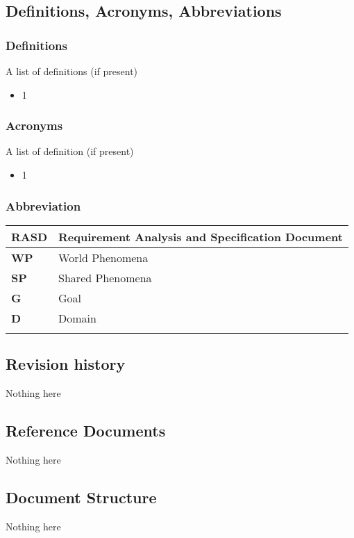 \subsection{Definitions, Acronyms, Abbreviations}
\subsubsection*{Definitions}
A list of definitions (if present)
\begin{itemize}
    \item 1
\end{itemize}
\subsubsection*{Acronyms}
A list of definition (if present)
\begin{itemize}
    \item 1
\end{itemize}
\subsubsection*{Abbreviation}
\begin{table}[h]
    \begin{tabular}{|l|l|}
        \toprule
        \textbf{RASD} & Requirement Analysis and Specification Document \\ \midrule
        \textbf{WP}   & World Phenomena                                 \\ \midrule
        \textbf{SP}   & Shared Phenomena                                \\ \midrule
        \textbf{G}    & Goal                                            \\ \midrule
        \textbf{D}    & Domain                                          \\ \midrule
                      &                                                 \\ \bottomrule
    \end{tabular}
\end{table}
\subsection{Revision history}
Nothing here

\subsection{Reference Documents}
Nothing here

\subsection{Document Structure}
Nothing here
